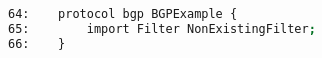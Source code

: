 \begin{lstlisting}[language=bash, caption={Bird4.conf contents.}]
64:    protocol bgp BGPExample {
65:        import Filter NonExistingFilter;
66:    }
\end{lstlisting}